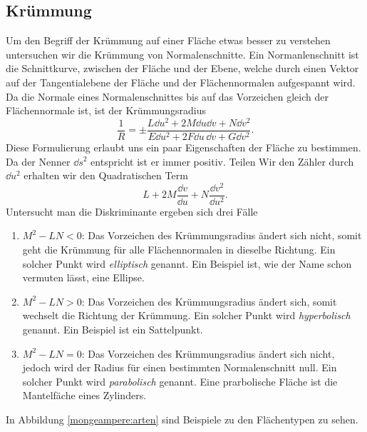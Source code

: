 \subsection{Krümmung}
Um den Begriff der Krümmung auf einer Fläche etwas besser zu verstehen
untersuchen wir die Krümmung von Normalenschnitte.
Ein Normanlenschnitt ist die Schnittkurve, zwischen der Fläche und der Ebene, welche durch einen Vektor auf 
der Tangentialebene der Fläche und der Flächennormalen aufgespannt wird.
Da die Normale eines Normalenschnittes bis auf das Vorzeichen gleich der Flächennormale ist, ist der 
Krümmungsradius
\begin{equation}
  \frac{1}{R} = \pm \frac{L \dd u^2 + 2 M \dd u \dd v + N \dd v^2}
                  {E \dd u^2 + 2F \dd u \, \dd v + G\dd v^2}.
  \label{mongeampere:normkrum}
\end{equation}
Diese Formulierung erlaubt uns ein paar Eigenschaften der Fläche zu bestimmen.
Da der Nenner $\dd s^2$ entspricht ist er immer positiv. 
Teilen Wir den Zähler durch $\dd u^2$ erhalten wir den Quadratischen Term
\begin{equation}
   L + 2M \frac{\dd v}{\dd u} + N \frac{\dd v^2}{\dd u ^2}.
  \label{mongemapere:dsik}
\end{equation}
Untersucht man die Diskriminante ergeben sich drei Fälle
\begin{enumerate}
  \item $M^2 - LN < 0$: Das Vorzeichen des Krümmungsradius ändert sich nicht, somit geht die Krümmung für alle 
    Flächennormalen in dieselbe Richtung. 
    Ein solcher Punkt wird \emph{elliptisch} genannt. Ein Beispiel ist, wie der 
    Name schon vermuten lässt, eine Ellipse.
  \item $M^2 - LN > 0$: Das Vorzeichen des Krümmungsradius ändert sich, somit wechselt die Richtung der Krümmung.
    Ein solcher Punkt wird \emph{hyperbolisch} genannt. Ein Beispiel ist ein Sattelpunkt.
  \item $M^2 - LN = 0$: Das Vorzeichen des Krümmungsradius ändert sich nicht, jedoch wird der Radius für einen 
    bestimmten Normalenschnitt null. 
    Ein solcher Punkt wird \emph{parabolisch} genannt. Eine prarbolische Fläche ist die Mantelfäche eines Zylinders. 
\end{enumerate}
In Abbildung \ref{mongeampere:arten} sind Beispiele zu den Flächentypen zu sehen.
